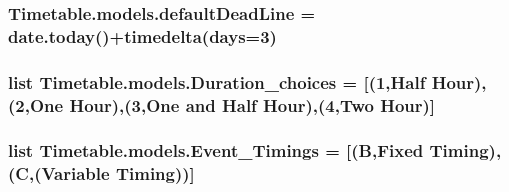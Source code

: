 \subsubsection[{\texorpdfstring{default\+Dead\+Line}{defaultDeadLine}}]{\setlength{\rightskip}{0pt plus 5cm}Timetable.\+models.\+default\+Dead\+Line = date.\+today()+timedelta(days=3)}\hypertarget{namespaceTimetable_1_1models_a6b1be2b87de430a3f0820a4908c608fd}{}\label{namespaceTimetable_1_1models_a6b1be2b87de430a3f0820a4908c608fd}
\subsubsection[{\texorpdfstring{Duration\+\_\+choices}{Duration_choices}}]{\setlength{\rightskip}{0pt plus 5cm}list Timetable.\+models.\+Duration\+\_\+choices = \mbox{[}(\textquotesingle{}1\textquotesingle{},\textquotesingle{}Half Hour\textquotesingle{}),(\textquotesingle{}2\textquotesingle{},\textquotesingle{}One Hour\textquotesingle{}),(\textquotesingle{}3\textquotesingle{},\textquotesingle{}One and Half Hour\textquotesingle{}),(\textquotesingle{}4\textquotesingle{},\textquotesingle{}Two Hour\textquotesingle{})\mbox{]}}\hypertarget{namespaceTimetable_1_1models_a3de5e5d97c7dbbfd08e212b9d1ad3ec5}{}\label{namespaceTimetable_1_1models_a3de5e5d97c7dbbfd08e212b9d1ad3ec5}
\subsubsection[{\texorpdfstring{Event\+\_\+\+Timings}{Event_Timings}}]{\setlength{\rightskip}{0pt plus 5cm}list Timetable.\+models.\+Event\+\_\+\+Timings = \mbox{[}(\textquotesingle{}B\textquotesingle{},\textquotesingle{}Fixed Timing\textquotesingle{}),(\textquotesingle{}C\textquotesingle{},(\textquotesingle{}Variable Timing\textquotesingle{}))\mbox{]}}\hypertarget{namespaceTimetable_1_1models_aed6c941f263e653fcb4c0da06577c61b}{}\label{namespaceTimetable_1_1models_aed6c941f263e653fcb4c0da06577c61b}
